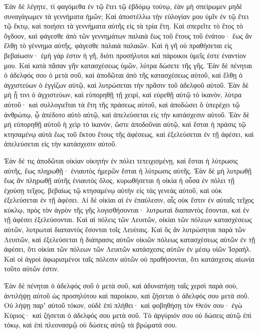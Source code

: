{Ἐὰν δὲ λέγητε, τί φαγόμεθα ἐν τῷ ἔτει τῷ ἑβδόμῳ τούτῳ, ἐὰν μὴ σπείρωμεν μηδὲ συναγάγωμεν τὰ γεννήματα ἡμῶν;
Καὶ ἀποστέλλω τὴν εὐλογίαν μου ὑμῖν ἐν τῷ ἔτει τῷ ἕκτῳ, καὶ ποιήσει τὰ γεννήματα αὐτῆς εἰς τὰ τρία ἔτη.
Καὶ σπερεῖτε τὸ ἔτος τὸ ὄγδοον, καὶ φάγεσθε ἀπὸ τῶν γεννημάτων παλαιὰ ἕως τοῦ ἔτους τοῦ ἐνάτου· ἕως ἂν ἔλθῃ τὸ γέννημα αὐτῆς, φάγεσθε παλαιὰ παλαιῶν.
Καὶ ἡ γῆ οὐ πραθήσεται εἰς βεβαίωσιν· ἐμὴ γάρ ἐστιν ἡ γῆ, διότι προσήλυτοι καὶ πάροικοι ὑμεῖς ἐστε ἐναντίον μου.
Καὶ κατὰ πᾶσαν γῆν κατασχέσεως ὑμῶν, λύτρα δώσετε τῆς γῆς.
Ἐὰν δὲ πένηται ὁ ἀδελφός σου ὁ μετὰ σοῦ, καὶ ἀποδῶται ἀπὸ τῆς κατασχέσεως αὐτοῦ, καὶ ἔλθῃ ὁ ἀγχιστεύων ὁ ἐγγίζων αὐτῷ, καὶ λυτρώσεται τὴν πρᾶσιν τοῦ ἀδελφοῦ αὐτοῦ.
Ἐὰν δὲ μὴ ᾖ τινι ὁ ἀγχιστεύων, καὶ εὐπορηθῇ τῇ χειρὶ, καὶ εὑρεθῇ αὐτῷ τὸ ἱκανὸν, λύτρα αὐτοῦ·
καὶ συλλογιεῖται τὰ ἔτη τῆς πράσεως αὐτοῦ, καὶ ἀποδώσει ὅ ὑπερέχει τῷ ἀνθρώπῳ, ᾧ ἀπέδοτο αὐτὸ αὐτῷ, καὶ ἀπελεύσεται εἰς τὴν κατάσχεσιν αὐτοῦ.
Ἐὰν δὲ μὴ εὑπορηθῇ αὐτοῦ ἡ χεὶρ τὸ ἱκανὸν, ὥστε ἀποδοῦναι αὐτῷ, καὶ ἔσται ἡ πράσις τῷ κτησαμένῳ αὐτὰ ἕως τοῦ ἕκτου ἔτους τῆς ἀφέσεως, καὶ ἐξελεύσεται ἐν τῇ ἀφέσει, καὶ ἀπελεύσεται εἰς τὴν κατάσχεσιν αὐτοῦ.
\par }{\PP {}Ἐὰν δέ τις ἀποδῶται οἰκίαν οἰκητὴν ἐν πόλει τετειχισμένῃ, καὶ ἔσται ἡ λύτρωσις αὐτῆς, ἕως πληρωθῇ· ἐνιαυτὸς ἡμερῶν ἔσται ἡ λύτρωσις αὐτῆς.
Ἐὰν δὲ μὴ λυτρωθῇ ἕως ἂν πληρωθῇ αὐτῆς ἐνιαυτὸς ὅλος, κυρωθήσεται ἡ οἰκία ἡ οὖσα ἐν πόλει τῇ ἐχούσῃ τεῖχος, βεβαίως τῷ κτησαμένῳ αὐτὴν εἰς τὰς γενεὰς αὐτοῦ, καὶ οὐκ ἐξελεύσεται ἐν τῇ ἀφέσει.
Αἱ δὲ οἰκίαι αἱ ἐν ἐπαύλεσιν, αἷς οὐκ ἔστιν ἐν αὐταῖς τεῖχος κύκλῳ, πρὸς τὸν ἀγρὸν τῆς γῆς λογισθήσονται· λυτρωταὶ διαπαντὸς ἔσονται, καὶ ἐν τῇ ἀφέσει ἐξελεύσονται.
Καὶ αἱ πόλεις τῶν Λευιτῶν, οἰκίαι τῶν πόλεων κατασχέσεως αὐτῶν, λυτρωταὶ διαπαντὸς ἔσονται τοῖς Λευίταις.
Καὶ ὃς ἂν λυτρώσηται παρὰ τῶν Λευιτῶν, καὶ ἐξελεύσεται ἡ διάπρασις αὐτῶν οἰκιῶν πόλεως κατασχέσεως αὐτῶν ἐν τῇ ἀφέσει, ὅτι οἰκίαι τῶν πόλεων τῶν Λευιτῶν κατάσχεσις αὐτῶν ἐν μέσῳ υἱῶν Ἰσραήλ.
Καὶ οἱ ἀγροὶ ἀφωρισμένοι ταῖς πόλεσιν αὐτῶν οὐ πραθήσονται, ὅτι κατάσχεσις αἰωνία τοῦτο αὐτῶν ἐστιν.
\par }{\PP {}Ἐὰν δὲ πένηται ὁ ἀδελφός σοῦ ὁ μετὰ σοῦ, καὶ ἀδυνατήσῃ ταῖς χερσὶ παρὰ σοὺ, ἀντιλήψῃ αὐτοῦ ὡς προσηλύτου καὶ παροίκου, καὶ ζήσεται ὁ ἀδελφός σου μετὰ σοῦ.
Οὐ λήψῃ παρʼ αὐτοῦ τόκον, οὐδὲ ἐπὶ πλήθει· καὶ φοβηθήσῃ τὸν Θεόν σου· ἐγὼ Κύριος· καὶ ζήσεται ὁ ἀδελφός σου μετὰ σοῦ.
Τὸ ἀργύριόν σου οὐ δώσεις αὐτῷ ἐπὶ τὸκῳ, καὶ ἐπὶ πλεονασμῷ οὐ δώσεις αὐτῷ τὰ βρώματά σου.
}
